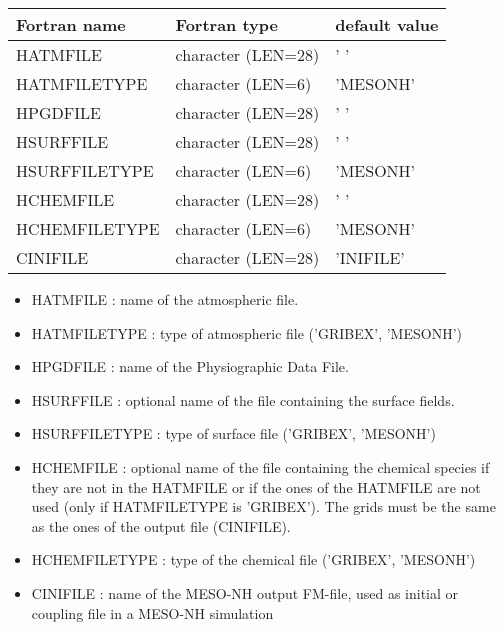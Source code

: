 \begin{center}
\begin{tabular} {|l|l|l|}
\hline
Fortran name & Fortran type & default value\\
\hline
\hline
HATMFILE      & character (LEN=28) & ' '           \\
HATMFILETYPE  & character (LEN=6)  & 'MESONH'      \\
HPGDFILE      & character (LEN=28) & ' '           \\
HSURFFILE     & character (LEN=28) & ' '           \\
HSURFFILETYPE & character (LEN=6)  & 'MESONH'      \\
HCHEMFILE     & character (LEN=28) & ' '           \\
HCHEMFILETYPE & character (LEN=6)  & 'MESONH'      \\
CINIFILE      & character (LEN=28) & 'INIFILE'     \\
\hline
\end{tabular}
\end{center}

\begin{itemize}
\item HATMFILE : name of the atmospheric file.
\item HATMFILETYPE : type of  atmospheric file ('GRIBEX', 'MESONH')
\item HPGDFILE : name of the Physiographic Data File.
\item HSURFFILE : optional name of the file containing the surface fields.
\item HSURFFILETYPE : type of surface file ('GRIBEX', 'MESONH')
\item HCHEMFILE : optional name of the file containing
the chemical species if they are not in the HATMFILE or if the ones of the
HATMFILE are not used (only if HATMFILETYPE is 'GRIBEX'). The grids must
be the same as the ones of the output file (CINIFILE).
\item HCHEMFILETYPE : type of the chemical file ('GRIBEX', 'MESONH')
\item CINIFILE : name of the MESO-NH output FM-file, used as initial
or coupling file in a MESO-NH simulation
\end{itemize}
\newpage
